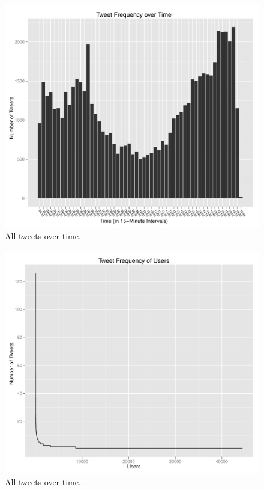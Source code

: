 \documentclass[a4paper, 11pt, titlepage]{article}
\begin{document}
\begin{figure}[h]
\centering
\includegraphics[width=120mm]{../figures/all_tweets_over_time}
\caption{All tweets over time.}
\label{fig:all_tweets_over_time}
\end{figure}

\begin{figure}[h]
\centering
\includegraphics[width=120mm]{../figures/all_tweets_by_users}
\caption{All tweets over time..}
\label{fig:all_tweets_by_users}
\end{figure}
\end{document}
